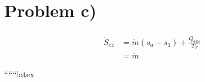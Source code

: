 \section*{Problem c)}

\begin{align*}
\dot{S}_{ez} &= \dot{m} (s_a - s_1) + \frac{\dot{Q}_{aus}}{T_F} \\
&= \dot{m}
\end{align*}

``````latex